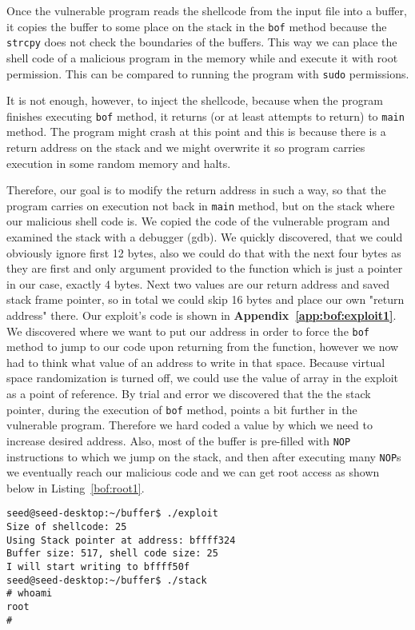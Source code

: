 \documentclass[12pt, a4paper, pdflatex]{article}
\begin{document}
Once the vulnerable program reads the shellcode from the input file into a buffer, it copies the buffer to some place on the stack in the \texttt{bof} method because the \texttt{strcpy} does not check the boundaries of the buffers. This way we can place the shell code of a malicious program in the memory while and execute it with root permission. This can be compared to running the program with \texttt{sudo} permissions.

It is not enough, however, to inject the shellcode, because when the program finishes executing \texttt{bof} method, it returns (or at least attempts to return) to \texttt{main} method. The program might crash at this point and this is because there is a return address on the stack and we might overwrite it so program carries execution in some random memory and halts.

Therefore, our goal is to modify the return address in such a way, so that the program carries on execution not back in \texttt{main} method, but on the stack where our malicious shell code is. We copied the code of the vulnerable program and examined the stack with a debugger (gdb). We quickly discovered, that we could obviously ignore first 12 bytes, also we could do that with the next four bytes as they are first and only argument provided to the function which is just a pointer in our case, exactly 4 bytes. Next two values are our return address and saved stack frame pointer, so in total we could skip 16 bytes and place our own "return address" there. Our exploit's code is shown in \textbf{Appendix~\ref{app:bof:exploit1}}.
We discovered where we want to put our address in order to force the \texttt{bof} method to jump to our code upon returning from the function, however we now had to think what value of an address to write in that space. Because virtual space randomization is turned off, we could use the value of  array in the exploit as a point of reference. By trial and error we discovered that the the stack pointer, during the execution of \texttt{bof} method, points a bit further in the vulnerable program. Therefore we hard coded a value by which we need to increase desired address. Also, most of the buffer is pre-filled with \texttt{NOP} instructions to which we jump on the stack, and then after executing many \texttt{NOP}s we eventually reach our malicious code and we can get root access as shown below in Listing~\ref{bof:root1}.
\vspace{1em}
\lstset{
	captionpos=b,
	frame=single,
	language=BASH,
	breaklines=true,
	caption=Function with buffer overflow vulnerability,
	label=bof:root1,
  float=tb
}
\begin{lstlisting}
seed@seed-desktop:~/buffer$ ./exploit 
Size of shellcode: 25
Using Stack pointer at address: bffff324
Buffer size: 517, shell code size: 25
I will start writing to bffff50f
seed@seed-desktop:~/buffer$ ./stack 
# whoami                                                                       
root
# 
\end{lstlisting}
\end{document}
